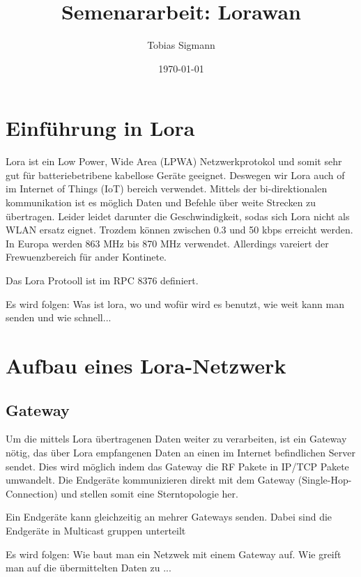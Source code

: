 \documentclass[a4paper,12pt]{article}
\author{Tobias Sigmann}
\title{Semenararbeit: Lorawan}
\date{\today}
\begin{document}
    \maketitle
    \tableofcontents
    \newpage
    \begin{abstract} 
       \cite{WhatIsLoRa}
       \cite{Semtech}
    \end{abstract}

    \section{Einführung in Lora}
    Lora ist ein Low Power, Wide Area (LPWA) Netzwerkprotokol und somit sehr gut für batteriebetribene kabellose Geräte geeignet. Deswegen wir Lora auch of im Internet of Things (IoT) bereich verwendet.
    Mittels der bi-direktionalen kommunikation ist es möglich Daten und Befehle über weite Strecken zu übertragen. Leider leidet darunter die Geschwindigkeit, sodas sich Lora nicht als WLAN ersatz eignet.
    Trozdem können zwischen 0.3 und 50 kbps erreicht werden. In Europa werden 863 MHz bis 870 MHz verwendet. Allerdings vareiert der Frewuenzbereich für ander Kontinete.
    
    Das Lora Protooll ist im RPC 8376 definiert.

        \cite{WhatIsLoRa}
        \cite{LoraLimit}
    \newline{}\newline{} Es wird folgen: Was ist lora, wo und wofür wird es benutzt, wie weit kann man senden und wie schnell...
    \section{Aufbau eines Lora-Netzwerk}
    \subsection{Gateway}
    Um die mittels Lora übertragenen Daten weiter zu verarbeiten, ist ein Gateway nötig, das über Lora empfangenen Daten an einen im Internet befindlichen Server sendet. Dies wird möglich indem das Gateway die RF Pakete in IP/TCP Pakete umwandelt.
    Die Endgeräte kommunizieren direkt mit dem Gateway (Single-Hop-Connection) und stellen somit eine Sterntopologie her.

    Ein Endgeräte kann gleichzeitig an mehrer Gateways senden. Dabei sind die Endgeräte in Multicast gruppen unterteilt 
        
    \cite{TheThing}
        \cite{WhatIsLoRa}
        \cite{LoRaSpec}
        \cite{RFC8376}
    \newline{}\newline{} Es wird folgen: Wie baut man ein Netzwek mit einem Gateway auf. Wie greift man auf die übermittelten Daten zu ...
\end{document}
